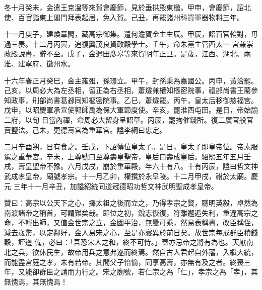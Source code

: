 \begin{pinyinscope}
 冬十月癸未，金遣王克溫等來賀會慶節，見於垂拱殿東楹。甲申，會慶節，詔北使、百官詣東上閣門拜表起居，免入賀。己丑，再罷諸州科買軍器物料三年。



 十一月庚子，建煥章閣，藏高宗御集。遣何澹賀金主生辰。甲辰，詔百官輪對，毋過三奏。十二月丙寅，追復龔茂良資政殿學士。壬午，命朱熹主管西太一
 宮兼崇政殿說書，辭不至。戊子，金遣田彥皋等來賀明年正旦。是歲，江西、湖北、兩淮、建寧府、徽州水。



 十六年春正月癸巳，金主雍殂，孫璟立。甲午，封孫秉為嘉國公。丙申，黃洽罷。己亥，以周必大為左丞相，留正為右丞相，蕭燧兼權知樞密院事，禮部尚書王藺參知政事，刑部尚書葛邲同知樞密院事。乙巳，蕭燧罷。丙午，皇太后移御慈福宮。戊申，以昭慶軍承宣使郭師禹為保大軍節度使。辛亥，罷淮西屯田。是日，帝始諭二府，以旬
 日當內禪，命周必大留身呈詔草。丙辰，罷拘催錢所。復二廣官般官賣鹽法。己未，更德壽宮為重華宮。謚李綱曰忠定。



 二月辛酉朔，日有食之。壬戌，下詔傳位皇太子。是日，皇太子即皇帝位。帝素服駕之重華宮。辛未，上尊號曰至尊壽皇聖帝，皇后曰壽成皇后。紹熙五年五月壬戌，壽皇聖帝不豫。六月戊戌，崩於重華殿，年六十有八。十有丙辰，謚曰哲文神武成孝皇帝，廟號孝宗。十一月乙卯，權攢於永阜陵。十二月甲戌，祔於太廟。慶元
 三年十一月辛丑，加謚紹統同道冠德昭功哲文神武明聖成孝皇帝。



 贊曰：高宗以公天下之心，擇太祖之後而立之，乃得孝宗之賢，聰明英毅，卓然為南渡諸帝之稱首，可謂難矣哉。即位之初，銳志恢復，符離邂逅失利，重違高宗之命，不輕出師，又值金世宗之立，金國平治，無釁可乘，然易表稱書，改臣稱侄，減去歲幣，以定鄰好，金人易宋之心，至是亦寢異於前日矣。故世宗每戒群臣積錢穀，謹邊
 備，必曰：「吾恐宋人之和，終不可恃。」蓋亦忌帝之將有為也。天厭南北之兵，欲休民生，故帝用兵之意弗遂而終焉。然自古人君起自外藩，入繼大統，而能盡宮庭之孝，未有若帝。其間父子怡愉，同享高壽，亦無有及之者。終喪三年，又能卻群臣之請而力行之。宋之廟號，若仁宗之為「仁」，孝宗之為「孝」，其無愧焉，其無愧焉！



\end{pinyinscope}